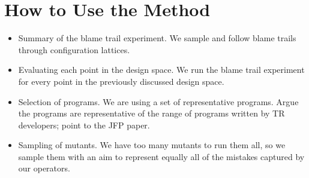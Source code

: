 \section{How to Use the Method}

\begin{itemize}

\item Summary of the blame trail experiment. We sample and follow blame trails through configuration
        lattices.

\item Evaluating each point in the design space. We run the blame trail experiment for every point in the
        previously discussed design space.

\item Selection of programs. We are using a set of representative
  programs. Argue the programs are representative of the range of programs written by TR developers; point to the JFP paper.

\item Sampling of mutants. We have too many mutants to run them all, so we sample them with an aim to represent equally all of the mistakes captured by our operators.

\end{itemize}
